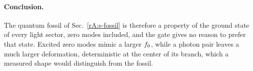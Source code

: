\paragraph{Conclusion.}
The quantum fossil of Sec.~\ref{rA:s-fossil} is therefore a property of the ground state of every light sector, zero modes included, and the gate gives no reason to prefer that state.
Excited zero modes mimic a larger $f_0$, while a photon pair leaves a much larger deformation, deterministic at the center of its branch, which a measured shape would distinguish from the fossil.
